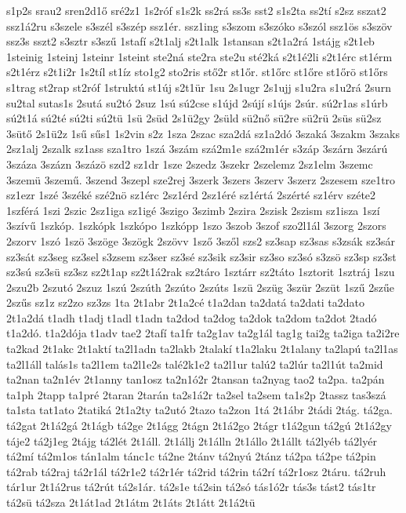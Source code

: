 {s1p2s
srau2
sren2d1ő
sré2z1
1s2róf
s1s2k
ss2rá
ss3s
sst2
s1s2ta
ss2tí
s2sz
sszat2
ssz1á2ru
s3szele
s3szél
s3szép
ssz1ér.
ssz1ing
s3szom
s3szóko
s3szól
ssz1ös
s3szöv
ssz3s
sszt2
s3sztr
s3szű
1stafí
s2t1alj
s2t1alk
1stansan
s2t1a2rá
1stájg
s2t1eb
1steinig
1steinj
1steinr
1steint
ste2ná
ste2ra
ste2u
sté2ká
s2t1é2li
s2t1érc
st1érm
s2t1érz
s2t1i2r
1s2tíl
st1íz
sto1g2
sto2ris
stő2r
st1őr.
st1őrc
st1őre
st1őrö
st1őrs
s1trag
st2rap
st2róf
1struktú
st1új
s2t1ür
1su
2s1ugr
2s1ujj
s1u2ra
s1u2rá
2surn
su2tal
sutas1s
2sutá
su2tó
2suz
1sú
sú2cse
s1újd
2sújí
s1újs
2súr.
sú2r1as
s1úrb
sú2t1á
sú2té
sú2ti
sú2tü
1sü
2süd
2s1ü2gy
2süld
sü2nő
sü2re
sü2rü
2süs
sü2sz
3sütő
2s1ü2z
1sű
sűs1
1s2vin
s2z
1sza
2szac
sza2dá
sz1a2dó
3szaká
3szakm
3szaks
2sz1alj
2szalk
sz1ass
sza1tro
1szá
3szám
szá2m1e
szá2m1ér
s3záp
3szárn
3szárú
3száza
3százn
3százö
szd2
sz1dr
1sze
2szedz
3szekr
2szelemz
2sz1elm
3szemc
3szemü
3szemű.
3szend
3szepl
sze2rej
3szerk
3szers
3szerv
3szerz
2szesem
sze1tro
sz1ezr
1szé
3széké
szé2nö
sz1érc
2sz1érd
2sz1éré
sz1értá
2szérté
sz1érv
széte2
1szférá
1szi
2szic
2sz1iga
sz1igé
3szigo
3szimb
2szira
2szisk
2szism
sz1isza
1szí
3szívű
1szkóp.
1szkópk
1szkópo
1szkópp
1szo
3szob
3szof
szo2l1ál
3szorg
2szors
2szorv
1szó
1szö
3szöge
3szögk
2szövv
1sző
3szől
szs2
sz3sap
sz3sas
s3zsák
sz3sár
sz3sát
sz3seg
sz3sel
s3zsem
sz3ser
sz3sé
sz3sik
sz3sir
sz3so
sz3só
s3zsö
sz3sp
sz3st
sz3sú
sz3sü
sz3sz
sz2t1ap
sz2t1á2rak
sz2táro
1sztárr
sz2táto
1sztorit
1sztráj
1szu
2szu2b
2szutó
2szuz
1szú
2szúth
2szúto
2szúts
1szü
2szüg
3szür
2szüt
1szű
2szűe
2szűs
sz1z
sz2zo
sz3zs
1ta
2t1abr
2t1a2cé
t1a2dan
ta2datá
ta2dati
ta2dato
2t1a2dá
t1adh
t1adj
t1adl
t1adn
ta2dod
ta2dog
ta2dok
ta2dom
ta2dot
2tadó
t1a2dó.
t1a2dója
t1adv
tae2
2tafí
ta1fr
ta2g1av
ta2g1ál
tag1g
tai2g
ta2iga
ta2i2re
ta2kad
2t1akc
2t1aktí
ta2l1adn
ta2lakb
2talakí
t1a2laku
2t1alany
ta2lapú
ta2l1as
ta2l1áll
talás1s
ta2l1em
ta2l1e2s
talé2k1e2
ta2l1ur
talú2
ta2lúr
ta2l1út
ta2mid
ta2nan
ta2n1év
2t1anny
tan1osz
ta2n1ó2r
2tansan
ta2nyag
tao2
ta2pa.
ta2pán
ta1ph
2tapp
ta1pré
2taran
2tarán
ta2s1á2r
ta2sel
ta2sem
ta1s2p
2tassz
tas3szá
ta1sta
tat1ato
2tatiká
2t1a2ty
ta2utó
2tazo
ta2zon
1tá
2t1ábr
2tádi
2tág.
tá2ga.
tá2gat
2t1á2gá
2t1ágb
tá2ge
2t1ágg
2tágn
2t1á2go
2tágr
t1á2gun
tá2gú
2t1á2gy
táje2
tá2j1eg
2tájg
tá2lét
2t1áll.
2t1állj
2t1álln
2t1állo
2t1állt
tá2lyéb
tá2lyér
tá2mí
tá2m1os
tán1alm
tánc1c
tá2ne
2tánv
tá2nyú
2tánz
tá2pa
tá2pe
tá2pin
tá2rab
tá2raj
tá2r1ál
tá2r1e2
tá2r1ér
tá2rid
tá2rin
tá2rí
tá2r1osz
2táru.
tá2ruh
tár1ur
2t1á2rus
tá2rút
tá2s1ár.
tá2s1e
tá2sin
tá2só
tás1ó2r
tás3s
tást2
tás1tr
tá2sü
tá2sza
2t1át1ad
2t1átm
2t1áts
2t1átt
2t1á2tü
}
